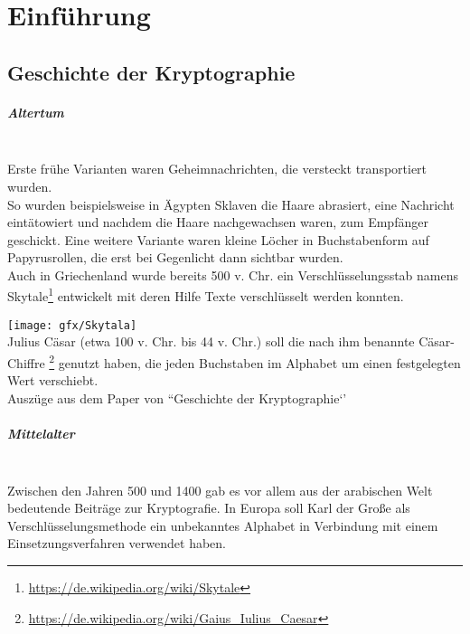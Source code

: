 
\chapter{Einführung} %

\label{ch:introduction} %


\section{Geschichte der Kryptographie}


\paragraph{Altertum}
\hfill\\
Erste frühe Varianten waren Geheimnachrichten, die versteckt transportiert wurden.\\
So wurden beispielsweise in Ägypten Sklaven die Haare abrasiert, eine Nachricht eintätowiert und nachdem die Haare nachgewachsen waren, zum Empfänger geschickt.
Eine weitere Variante waren kleine Löcher in Buchstabenform auf Papyrusrollen, die erst bei Gegenlicht dann sichtbar wurden.
\\ Auch in Griechenland wurde bereits 500 v. Chr. ein Verschlüsselungsstab namens Skytale\footnote{\url{https://de.wikipedia.org/wiki/Skytale}} entwickelt mit deren Hilfe Texte verschlüsselt werden konnten.

\texttt{[image: gfx/Skytala]}%
\hfill
\\ Julius Cäsar (etwa 100 v. Chr. bis 44 v. Chr.) soll die nach ihm benannte Cäsar-Chiffre \footnote{\url{https://de.wikipedia.org/wiki/Gaius_Iulius_Caesar}} genutzt haben, die jeden Buchstaben im Alphabet um einen festgelegten Wert verschiebt.
\\Auszüge aus dem Paper von \citeauthor{huetter:geschichte} ``Geschichte der Kryptographie`'\citep{huetter:geschichte}

\paragraph{Mittelalter}
\hfill\\
\citeauthor{al-kadi}Zwischen den Jahren 500 und 1400 gab es vor allem aus der arabischen Welt bedeutende Beiträge zur Kryptografie.\citep{al-kadi}
In Europa soll Karl der Große als Verschlüsselungsmethode ein unbekanntes Alphabet in Verbindung mit einem Einsetzungsverfahren verwendet haben.
\newpage

